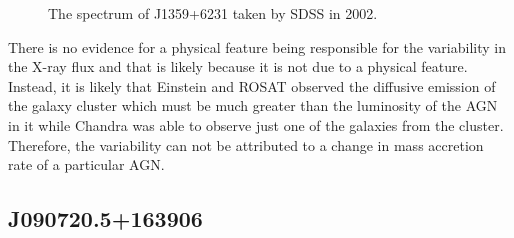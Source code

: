 \begin{figure}[h]
\centering
{}
\caption{The spectrum of J1359+6231 taken by SDSS in 2002. }
\label{imbeded_fb}
\end{figure}

There is no evidence for a physical feature being responsible for the variability in the X-ray flux and that is likely because it is not due to a physical feature.
Instead, it is likely that Einstein and ROSAT observed the diffusive emission of the galaxy cluster which must be much greater than the luminosity of the AGN in it while Chandra was able to observe just one of the galaxies from the cluster.
Therefore, the variability can not be attributed to a change in mass accretion rate of a particular AGN.


\FloatBarrier




\subsection{J090720.5+163906}

